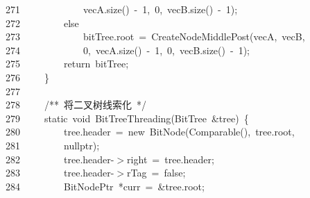 \documentclass[11pt,a4paper]{ctexart}
\newcommand{\hlstd}[1]{\textcolor[rgb]{0.2,0.2,0.2}{#1}}
\newcommand{\hlnum}[1]{\textcolor[rgb]{0.06,0.58,0.63}{#1}}
\newcommand{\hlcom}[1]{\textcolor[rgb]{0.59,0.59,0.59}{#1}}
\newcommand{\hlopt}[1]{\textcolor[rgb]{0.2,0.2,0.2}{#1}}
\newcommand{\hllin}[1]{\textcolor[rgb]{0.59,0.59,0.59}{#1}}
\newcommand{\hlkwa}[1]{\textcolor[rgb]{0.23,0.42,0.78}{#1}}
\newcommand{\hlkwb}[1]{\textcolor[rgb]{0.63,0,0.31}{#1}}
\newcommand{\hlkwc}[1]{\textcolor[rgb]{0,0.63,0.31}{#1}}
\newcommand{\hlkwd}[1]{\textcolor[rgb]{0.78,0.23,0.41}{#1}}
\begin{document}
\hllin{271\ }\hlstd{}\hlstd{\ \ \ \ \ \ \ \ \ \ \ \ }\hlstd{vecA}\hlopt{.}\hlstd{}\hlkwd{size}\hlstd{}\hlopt{()\ {-}\ }\hlstd{}\hlnum{1}\hlstd{}\hlopt{,\ }\hlstd{}\hlnum{0}\hlstd{}\hlopt{,\ }\hlstd{vecB}\hlopt{.}\hlstd{}\hlkwd{size}\hlstd{}\hlopt{()\ {-}\ }\hlstd{}\hlnum{1}\hlstd{}\hlopt{);}\\
\hllin{272\ }\hlstd{}\hlstd{\ \ \ \ \ \ \ \ }\hlstd{}\hlkwa{else}\\
\hllin{273\ }\hlstd{}\hlstd{\ \ \ \ \ \ \ \ \ \ \ \ }\hlstd{bitTree}\hlopt{.}\hlstd{root\ }\hlopt{=\ }\hlstd{}\hlkwd{CreateNodeMiddlePost}\hlstd{}\hlopt{(}\hlstd{vecA}\hlopt{,\ }\hlstd{vecB}\hlopt{,\ }\Righttorque\\
\hllin{274\ }\hlstd{}\hlstd{\ \ \ \ \ \ \ \ \ \ \ \ }\hlstd{}\hlnum{0}\hlstd{}\hlopt{,\ }\hlstd{vecA}\hlopt{.}\hlstd{}\hlkwd{size}\hlstd{}\hlopt{()\ {-}\ }\hlstd{}\hlnum{1}\hlstd{}\hlopt{,\ }\hlstd{}\hlnum{0}\hlstd{}\hlopt{,\ }\hlstd{vecB}\hlopt{.}\hlstd{}\hlkwd{size}\hlstd{}\hlopt{()\ {-}\ }\hlstd{}\hlnum{1}\hlstd{}\hlopt{);}\\
\hllin{275\ }\hlstd{}\hlstd{\ \ \ \ \ \ \ \ }\hlstd{}\hlkwa{return\ }\hlstd{bitTree}\hlopt{;}\\
\hllin{276\ }\hlstd{}\hlstd{\ \ \ \ }\hlstd{}\hlopt{\}}\\
\hllin{277\ }\hlstd{}\\
\hllin{278\ }\hlstd{}\hlstd{\ \ \ \ }\hlstd{}\hlcom{/{*}{*}\ 将二叉树线索化\ {*}/}\hlstd{}\\
\hllin{279\ }\hlstd{}\hlstd{\ \ \ \ }\hlstd{}\hlkwb{static\ void\ }\hlstd{}\hlkwd{BitTreeThreading}\hlstd{}\hlopt{(}\hlstd{BitTree\ }\hlopt{\&}\hlstd{tree}\hlopt{)\ \{}\\
\hllin{280\ }\hlstd{}\hlstd{\ \ \ \ \ \ \ \ }\hlstd{tree}\hlopt{.}\hlstd{header\ }\hlopt{=\ }\hlstd{}\hlkwa{new\ }\hlstd{}\hlkwd{BitNode}\hlstd{}\hlopt{(}\hlstd{}\hlkwd{Comparable}\hlstd{}\hlopt{(),\ }\hlstd{tree}\hlopt{.}\hlstd{root}\hlopt{,\ }\Righttorque\\
\hllin{281\ }\hlstd{}\hlstd{\ \ \ \ \ \ \ \ }\hlstd{}\hlkwc{nullptr}\hlstd{}\hlopt{);}\\
\hllin{282\ }\hlstd{}\hlstd{\ \ \ \ \ \ \ \ }\hlstd{tree}\hlopt{.}\hlstd{header}\hlopt{{-}$>$}\hlstd{right\ }\hlopt{=\ }\hlstd{tree}\hlopt{.}\hlstd{header}\hlopt{;}\\
\hllin{283\ }\hlstd{}\hlstd{\ \ \ \ \ \ \ \ }\hlstd{tree}\hlopt{.}\hlstd{header}\hlopt{{-}$>$}\hlstd{rTag\ }\hlopt{=\ }\hlstd{}\hlkwa{false}\hlstd{}\hlopt{;}\\
\hllin{284\ }\hlstd{}\hlstd{\ \ \ \ \ \ \ \ }\hlstd{BitNodePtr\ }\hlopt{{*}}\hlstd{curr\ }\hlopt{=\ \&}\hlstd{tree}\hlopt{.}\hlstd{root}\hlopt{;}\\
\end{document}
